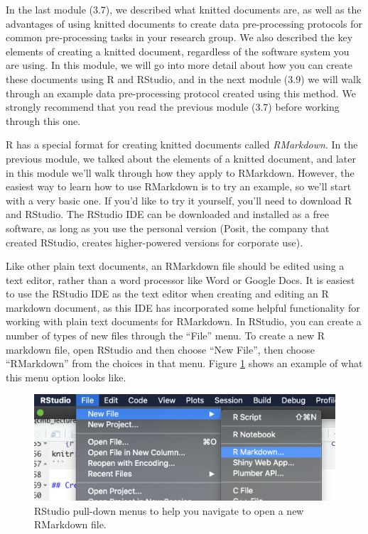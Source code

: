 \documentclass[]{tufte-book}
\begin{document}
In the last module (3.7), we described what knitted documents are, as well as the
advantages of using knitted documents to create data pre-processing protocols
for common pre-processing tasks in your research group. We also described the
key elements of creating a knitted document, regardless of the software system
you are using. In this module, we will
go into more detail about how you can create these documents using R and
RStudio, and in the next module (3.9) we will walk through an example data
pre-processing protocol created using this method. We strongly recommend that
you read the previous module (3.7) before working through this one.

R has a special format for creating knitted documents called \emph{RMarkdown}. In the
previous module, we talked about the elements of a knitted document, and later
in this module we'll walk through how they apply to RMarkdown. However, the
easiest way to learn how to use RMarkdown is to try an example, so we'll start
with a very basic one. If you'd like to try it yourself, you'll need to download
R and RStudio. The RStudio IDE can be downloaded and installed as a free
software, as long as you use the personal version (Posit, the company that
created RStudio, creates higher-powered versions for corporate use).

Like other plain text documents, an RMarkdown file should be edited using a text
editor, rather than a word processor like Word or Google Docs. It is easiest to
use the RStudio IDE as the text editor when creating and editing an R markdown
document, as this IDE has incorporated some helpful functionality for working
with plain text documents for RMarkdown. In RStudio, you can create a number of
types of new files through the ``File'' menu. To create a new R markdown file,
open RStudio and then choose ``New File'', then choose ``RMarkdown'' from the
choices in that menu. Figure \ref{fig:rmarkdownnewfile} shows an example of
what this menu option looks like.

\begin{figure}
\includegraphics[width=\textwidth]{figures/rmarkdown_newfile} \caption[RStudio pull-down menus to help you navigate to open a new RMarkdown file]{RStudio pull-down menus to help you navigate to open a new RMarkdown file.}\label{fig:rmarkdownnewfile}
\end{figure}
\end{document}
